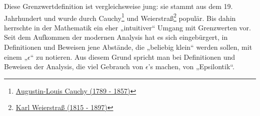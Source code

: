 \begin{bem}
 Diese Grenzwertdefinition ist vergleichsweise jung: sie stammt aus dem 19. Jahrhundert und wurde durch Cauchy\footnote{\href{https://de.wikipedia.org/wiki/Augustin-Louis_Cauchy}{Augustin-Louis Cauchy (1789 - 1857)}} und Weierstraß\footnote{\href{https://de.wikipedia.org/wiki/Karl_Weierstra\%C3\%9F}{Karl Weierstraß (1815 - 1897)}} populär. Bis dahin herrschte in der Mathematik ein eher „intuitiver“ Umgang mit Grenzwerten vor. \\[0.5em]
 Seit dem Aufkommen der modernen Analysis hat es sich eingebürgert, in Definitionen und Beweisen jene Abstände, die „beliebig klein“ werden sollen, mit einem „$\epsilon$“ zu notieren. Aus diesem Grund spricht man bei Definitionen und Beweisen der Analysis, die viel Gebrauch von $\epsilon$'s machen, von „Epsilontik“.
\end{bem}





